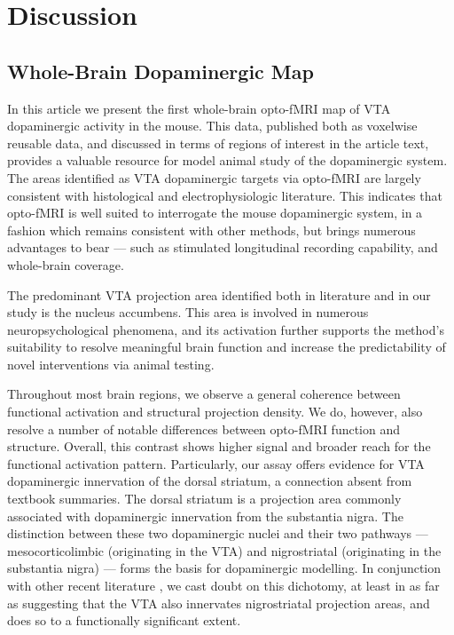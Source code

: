 \section{Discussion}

\subsection{Whole-Brain Dopaminergic Map}

In this article we present the first whole-brain opto-fMRI map of VTA dopaminergic activity in the mouse.
This data, published both as voxelwise reusable data, and discussed in terms of regions of interest in the article text, provides a valuable resource for model animal study of the dopaminergic system.
The areas identified as VTA dopaminergic targets via opto-fMRI are largely consistent with histological and electrophysiologic literature.
This indicates that opto-fMRI is well suited to interrogate the mouse dopaminergic system, in a fashion which remains consistent with other methods, but brings numerous advantages to bear --- such as stimulated longitudinal recording capability, and whole-brain coverage.

The predominant VTA projection area identified both in literature and in our study is the nucleus accumbens.
This area is involved in numerous neuropsychological phenomena, and its activation further supports the method's suitability to resolve meaningful brain function and increase the predictability of novel interventions via animal testing.

Throughout most brain regions, we observe a general coherence between functional activation and structural projection density.
We do, however, also resolve a number of notable differences between opto-fMRI function and structure.
Overall, this contrast shows higher signal and broader reach for the functional activation pattern.
Particularly, our assay offers evidence for VTA dopaminergic innervation of the dorsal striatum, a connection absent from textbook summaries.
The dorsal striatum is a projection area commonly associated with dopaminergic innervation from the substantia nigra.
The distinction between these two dopaminergic nuclei and their two pathways --- mesocorticolimbic (originating in the VTA) and nigrostriatal (originating in the substantia nigra) --- forms the basis for dopaminergic modelling.
In conjunction with other recent literature \cite{Lohani2016,Pan2010}, we cast doubt on this dichotomy, at least in as far as suggesting that the VTA also innervates nigrostriatal projection areas, and does so to a functionally significant extent.

